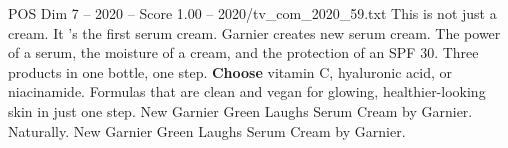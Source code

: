 \begin{textsample}{POS Dim 7 – 2020 – Score 1.00 – 2020/tv\_com\_2020\_59.txt}  \label{ex:f7_pos_090}
This is not just a cream.
It 's the first serum cream.
Garnier creates new serum cream.
The power of a serum, the moisture of a cream, and the protection of an SPF 30.
Three products in one bottle, one step. \textbf{Choose} vitamin C, hyaluronic acid, or niacinamide.
Formulas that are clean and vegan for glowing, healthier-looking skin in just one step.
New Garnier Green Laughs Serum Cream by Garnier.
Naturally.
New Garnier Green Laughs Serum Cream by Garnier.

\end{textsample}
